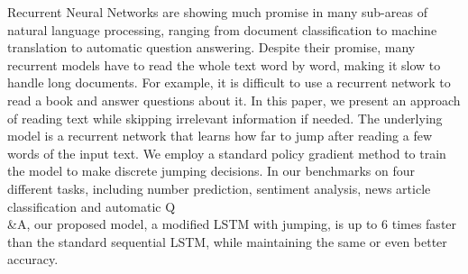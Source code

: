 Recurrent Neural Networks are showing much promise in many sub-areas of natural language processing, ranging from document classification to machine translation to automatic question answering. Despite their promise, many recurrent models have to read the whole text word by word, making it slow to handle long documents. For example, it is difficult to use a recurrent network to read a book and answer questions about it. In this paper, we present an approach of reading text while skipping irrelevant information if needed. The underlying model is a recurrent network that learns how far to jump after reading a few words of the input text. We employ a standard policy gradient method to train the model to make discrete jumping decisions. In our benchmarks on four different tasks, including number prediction, sentiment analysis, news article classification and automatic Q\\&A, our proposed model, a modified LSTM with jumping, is up to 6 times faster than the standard sequential LSTM, while maintaining the same or even better accuracy.
